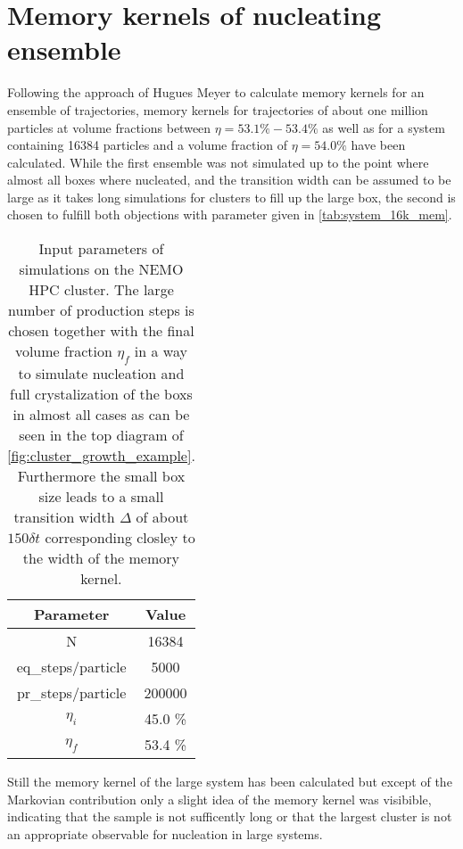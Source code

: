 \section{Memory kernels of nucleating ensemble}
\label{sec:memory_kernels}

Following the approach of Hugues Meyer to calculate memory kernels for an ensemble of trajectories\cite{Meyer2019a}, memory kernels for trajectories of about one million particles at volume fractions between $\eta = 53.1\% - 53.4\%$ as well as for a system containing 16384 particles and a volume fraction of $\eta = 54.0\% $ have been calculated. While the first ensemble was not simulated up to the point where almost all boxes where nucleated, and the transition width can be assumed to be large as it takes long simulations for clusters to fill up the large box, the second is chosen to fulfill both objections with parameter given in \autoref{tab:system_16k_mem}.\\

\begin{table}[ht]
\centering
\begin{tabular}{c|c}
Parameter & Value \\ \hline
N & 16384 \\
eq\_steps/particle & 5000 \\
pr\_steps/particle & 200000 \\
$\eta_i$ & 45.0 \% \\
$\eta_f$ & 53.4 \% \\
\end{tabular}
\caption[Simulation parameters of data production system with 16384 particles]{Input parameters of simulations on the NEMO HPC cluster. The large number of production steps is chosen together with the final volume fraction $\eta_f$ in a way to simulate nucleation and full crystalization of the boxs in almost all cases as can be seen in the top diagram of \autoref{fig:cluster_growth_example}. Furthermore the small box size leads to a small transition width $\Delta$ of about $150 \delta t$ corresponding closley to the width of the memory kernel.\cite{Meyer2021}} 
\label{tab:system_16k_mem}
\end{table}



Still the memory kernel of the large system has been calculated but except of the Markovian contribution only a slight idea of the memory kernel was visibible, indicating that the sample is not sufficently long or that the largest cluster is not an appropriate observable for nucleation in large systems.\\



